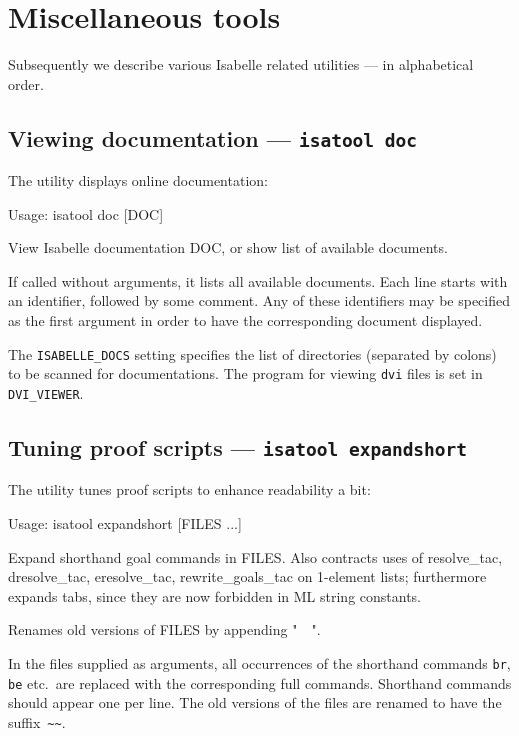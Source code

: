 

\chapter{Miscellaneous tools} \label{ch:tools}

Subsequently we describe various Isabelle related utilities --- in
alphabetical order.


\section{Viewing documentation --- \texttt{isatool doc}} \label{sec:tool-doc}

The  utility displays online documentation:
\begin{ttbox}
Usage: isatool doc [DOC]

  View Isabelle documentation DOC, or show list of available documents.
\end{ttbox}
If called without arguments, it lists all available documents. Each
line starts with an identifier, followed by some comment. Any of these
identifiers may be specified as the first argument in order to have
the corresponding document displayed.

\medskip The \texttt{ISABELLE_DOCS} setting specifies the list of
directories (separated by colons) to be scanned for documentations.
The program for viewing \texttt{dvi} files is set in
\texttt{DVI_VIEWER}.


\section{Tuning proof scripts --- \texttt{isatool expandshort}}

The  utility tunes {\ML} proof scripts to enhance
readability a bit:
\begin{ttbox}
Usage: isatool expandshort [FILES ...]

  Expand shorthand goal commands in FILES.  Also contracts uses of
  resolve_tac, dresolve_tac, eresolve_tac, rewrite_goals_tac on
  1-element lists; furthermore expands tabs, since they are now
  forbidden in ML string constants.

  Renames old versions of FILES by appending "~~".
\end{ttbox}
In the files supplied as arguments, all occurrences of the shorthand
commands \texttt{br}, \texttt{be} etc.\ are replaced with the
corresponding full commands.  Shorthand commands should appear one per
line.  The old versions of the files are renamed to have the
suffix~\verb'~~'.

